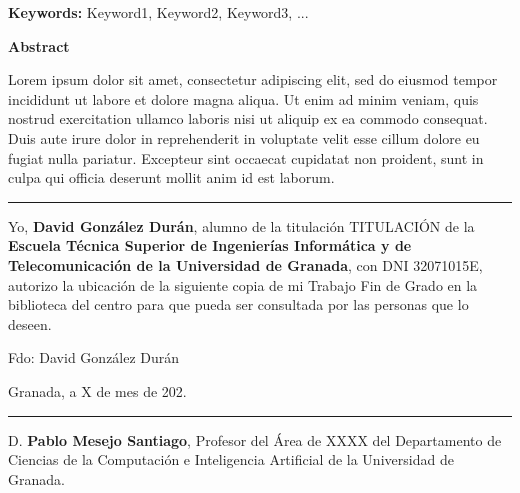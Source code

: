 \vspace{0.7cm}

\noindent\textbf{Keywords:} Keyword1, Keyword2, Keyword3, ...

\vspace{0.7cm}

\noindent\textbf{Abstract}

Lorem ipsum dolor sit amet, consectetur adipiscing elit, sed do eiusmod tempor incididunt ut labore et dolore magna aliqua. Ut enim ad minim veniam, quis nostrud exercitation ullamco laboris nisi ut aliquip ex ea commodo consequat. Duis aute irure dolor in reprehenderit in voluptate velit esse cillum dolore eu fugiat nulla pariatur. Excepteur sint occaecat cupidatat non proident, sunt in culpa qui officia deserunt mollit anim id est laborum.



\cleardoublepage
\thispagestyle{empty}

\noindent\rule{\textwidth}{2pt}\par\vspace{4.5ex}

Yo, \textbf{David González Durán}, alumno de la titulación TITULACIÓN de la \textbf{Escuela Técnica Superior
de Ingenierías Informática y de Telecomunicación de la Universidad de Granada}, con DNI 32071015E, autorizo la
ubicación de la siguiente copia de mi Trabajo Fin de Grado en la biblioteca del centro para que pueda ser
consultada por las personas que lo deseen.

\vspace{6cm}

\noindent Fdo: David González Durán

\vspace{2cm}

\begin{flushright}
    Granada, a X de mes de 202.
\end{flushright}


\cleardoublepage
\thispagestyle{empty}

\noindent\rule{\textwidth}{2pt}\par\vspace{4.5ex}

D. \textbf{Pablo Mesejo Santiago}, Profesor del Área de XXXX del Departamento de Ciencias de la Computación e Inteligencia Artificial de la Universidad de Granada.

